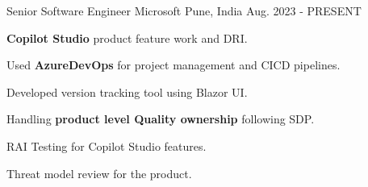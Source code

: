 

\begin{cventries}

  \cventry
    {Senior Software Engineer} %
    {Microsoft} %
    {Pune, India} %
    {Aug. 2023 - PRESENT} %
    {
      \begin{cvitems} %
	    \item {\textbf{Copilot Studio} product feature work and DRI.}
	    \item {Used \textbf{AzureDevOps} for project management and CICD pipelines.}
	    \item {Developed version tracking tool using Blazor UI.}
	    \item {Handling \textbf{product level Quality ownership} following SDP.}
	    \item {RAI Testing for Copilot Studio features.}
      \ \item {Threat model review for the product.}
      \end{cvitems}
    }


\end{cventries}
